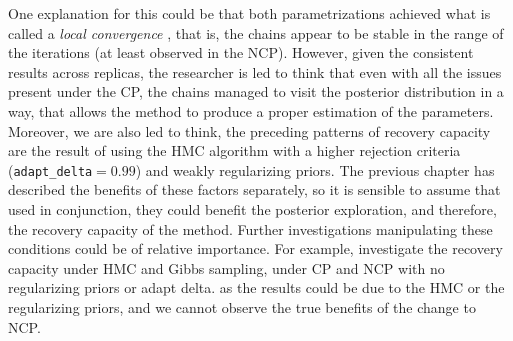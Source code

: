 One explanation for this could be that both parametrizations achieved what is called a \textit{local convergence} \cite{Depaoli_2021}, that is, the chains appear to be stable in the range of the iterations (at least observed in the NCP). However, given the consistent results across replicas, the researcher is led to think that even with all the issues present under the CP, the chains managed to visit the posterior distribution in a way, that allows the method to produce a proper estimation of the parameters. Moreover, we are also led to think, the preceding patterns of recovery capacity are the result of using the HMC algorithm with a higher rejection criteria (\texttt{adapt\_delta}$=0.99$) and weakly regularizing priors. The previous chapter has described the benefits of these factors separately, so it is sensible to assume that used in conjunction, they could benefit the posterior exploration, and therefore, the recovery capacity of the method. Further investigations manipulating these conditions could be of relative importance. For example, investigate the recovery capacity under HMC and Gibbs sampling, under CP and NCP with no regularizing priors or adapt delta. as the results could be due to the HMC or the regularizing priors, and we cannot observe the true benefits of the change to NCP.